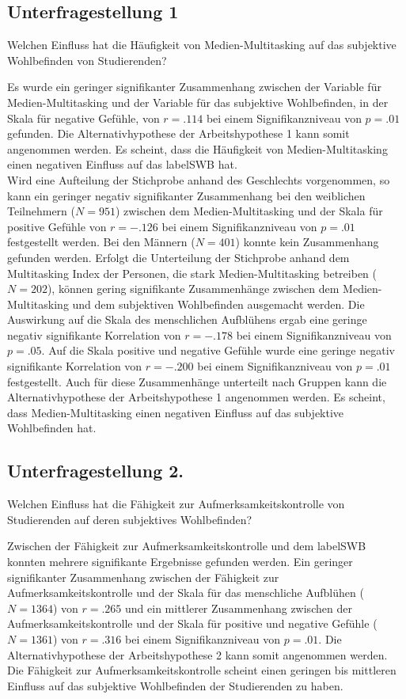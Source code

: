 \subsection{Unterfragestellung 1} Welchen Einfluss hat die Häufigkeit von Medien-Multitasking auf das subjektive Wohlbefinden von Studierenden?
\par
Es wurde ein geringer signifikanter Zusammenhang zwischen der Variable für Medien-Multitasking und der Variable für das subjektive Wohlbefinden, in der Skala für negative Gefühle, von $r=.114$ bei einem Signifikanzniveau von $p=.01$ gefunden. Die Alternativhypothese der Arbeitshypothese 1 kann somit angenommen werden. Es scheint, dass die Häufigkeit von Medien-Multitasking einen negativen Einfluss auf das \gls{labelSWB} hat. \\
Wird eine Aufteilung der Stichprobe anhand des Geschlechts vorgenommen, so kann ein geringer negativ signifikanter Zusammenhang bei den weiblichen Teilnehmern ($N=951$) zwischen dem Medien-Multitasking und der Skala für positive Gefühle von $r=-.126$ bei einem Signifikanzniveau von $p=.01$ festgestellt werden. Bei den Männern ($N=401$) konnte kein Zusammenhang gefunden werden. Erfolgt die Unterteilung der Stichprobe anhand dem Multitasking Index der Personen, die stark Medien-Multitasking betreiben ($N=202$), können gering signifikante Zusammenhänge zwischen dem Medien-Multitasking und dem subjektiven Wohlbefinden ausgemacht werden. Die Auswirkung auf die Skala des  menschlichen Aufblühens ergab eine geringe negativ signifikante Korrelation von $r=-.178$ bei einem Signifikanzniveau von $p=.05$. Auf die Skala positive und negative Gefühle wurde eine geringe negativ signifikante Korrelation von $r=-.200$ bei einem Signifikanzniveau von $p=.01$ festgestellt. Auch für diese Zusammenhänge unterteilt nach Gruppen kann die Alternativhypothese der Arbeitshypothese 1 angenommen werden. Es scheint, dass Medien-Multitasking einen negativen Einfluss auf das subjektive Wohlbefinden hat.

\subsection{Unterfragestellung 2.} Welchen Einfluss hat die Fähigkeit zur Aufmerksamkeitskontrolle von Studierenden auf deren subjektives Wohlbefinden?

Zwischen der Fähigkeit zur Aufmerksamkeitskontrolle und dem \gls{labelSWB} konnten mehrere signifikante Ergebnisse gefunden werden. Ein geringer signifikanter Zusammenhang zwischen der Fähigkeit zur Aufmerksamkeitskontrolle und der Skala für das menschliche Aufblühen ($N=1364$) von $r=.265$ und ein mittlerer Zusammenhang zwischen der Aufmerksamkeitskontrolle und der Skala für positive und negative Gefühle ($N=1361$) von $r=.316$ bei einem Signifikanzniveau von $p=.01$. Die Alternativhypothese der Arbeitshypothese 2 kann somit angenommen werden. Die Fähigkeit zur Aufmerksamkeitskontrolle scheint einen geringen bis mittleren Einfluss auf das subjektive Wohlbefinden der Studierenden zu haben.

